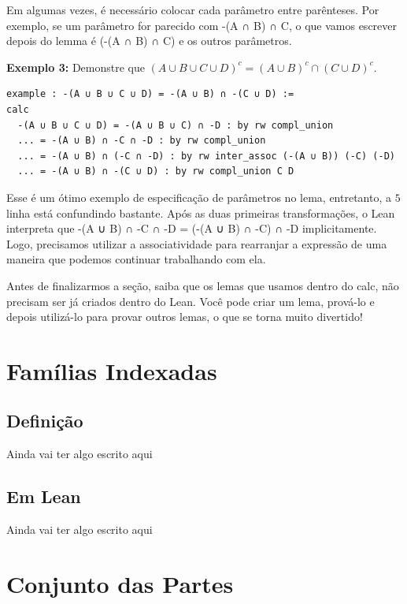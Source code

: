Em algumas vezes, é necessário colocar cada parâmetro entre parênteses. Por exemplo, se um parâmetro for parecido com {\selectfont -(A ∩ B) ∩ C}, o que vamos escrever depois do lemma é {\selectfont (-(A ∩ B) ∩ C)} e os outros parâmetros.

\textbf{Exemplo 3:} Demonstre que $(A \cup B \cup C \cup D)^c = (A \cup B)^c \cap (C \cup D)^c$.

\begin{lstlisting}
example : -(A ∪ B ∪ C ∪ D) = -(A ∪ B) ∩ -(C ∪ D) :=
calc
  -(A ∪ B ∪ C ∪ D) = -(A ∪ B ∪ C) ∩ -D : by rw compl_union
  ... = -(A ∪ B) ∩ -C ∩ -D : by rw compl_union
  ... = -(A ∪ B) ∩ (-C ∩ -D) : by rw inter_assoc (-(A ∪ B)) (-C) (-D)
  ... = -(A ∪ B) ∩ -(C ∪ D) : by rw compl_union C D \end{lstlisting}

Esse é um ótimo exemplo de especificação de parâmetros no lema, entretanto, a $5$ linha está confundindo bastante. Após as duas primeiras transformações, o Lean interpreta que {\selectfont -(A ∪ B) ∩ -C ∩ -D = (-(A ∪ B) ∩ -C) ∩ -D} implicitamente. Logo, precisamos utilizar a associatividade para rearranjar a expressão de uma maneira que podemos continuar trabalhando com ela.

Antes de finalizarmos a seção, saiba que os lemas que usamos dentro do {\selectfont calc}, não precisam ser já criados dentro do Lean. Você pode criar um lema, prová-lo e depois utilizá-lo para provar outros lemas, o que se torna muito divertido!
\section{Famílias Indexadas}

\subsection{Definição}
Ainda vai ter algo escrito aqui

\subsection{Em Lean}
Ainda vai ter algo escrito aqui

\section{Conjunto das Partes}

